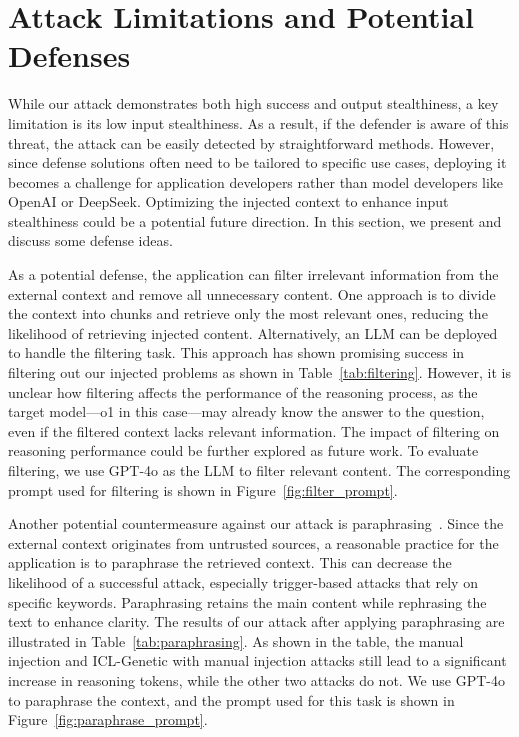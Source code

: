 \section{Attack Limitations and Potential Defenses}


While our attack demonstrates both high success and output stealthiness, a key limitation is its low input stealthiness. As a result, if the defender is aware of this threat, the attack can be easily detected by straightforward methods. However, since defense solutions often need to be tailored to specific use cases, deploying it becomes a challenge for application developers rather than model developers like OpenAI or DeepSeek. Optimizing the injected context to enhance input stealthiness could be a potential future direction. In this section, we present and discuss some defense ideas.

As a potential defense, the application can filter irrelevant information from the external context and remove all unnecessary content. One approach is to divide the context into chunks and retrieve only the most relevant ones, reducing the likelihood of retrieving injected content. Alternatively, an LLM can be deployed to handle the filtering task. This approach has shown promising success in filtering out our injected problems as shown in Table~\ref{tab:filtering}. However, it is unclear how filtering affects the performance of the reasoning process, as the target model—o1 in this case—may already know the answer to the question, even if the filtered context lacks relevant information. The impact of filtering on reasoning performance could be further explored as future work. To evaluate filtering, we use GPT-4o as the LLM to filter relevant content. The corresponding prompt used for filtering is shown in Figure~\ref{fig:filter_prompt}.

Another potential countermeasure against our attack is paraphrasing~\citep{jain2023baseline, gong2024paraphrasing}. Since the external context originates from untrusted sources, a reasonable practice for the application is to paraphrase the retrieved context. This can decrease the likelihood of a successful attack, especially trigger-based attacks that rely on specific keywords. Paraphrasing retains the main content while rephrasing the text to enhance clarity. The results of our attack after applying paraphrasing are illustrated in Table~\ref{tab:paraphrasing}. As shown in the table, the manual injection and ICL-Genetic with manual injection attacks still lead to a significant increase in reasoning tokens, while the other two attacks do not. We use GPT-4o to paraphrase the context, and the prompt used for this task is shown in Figure~\ref{fig:paraphrase_prompt}.

